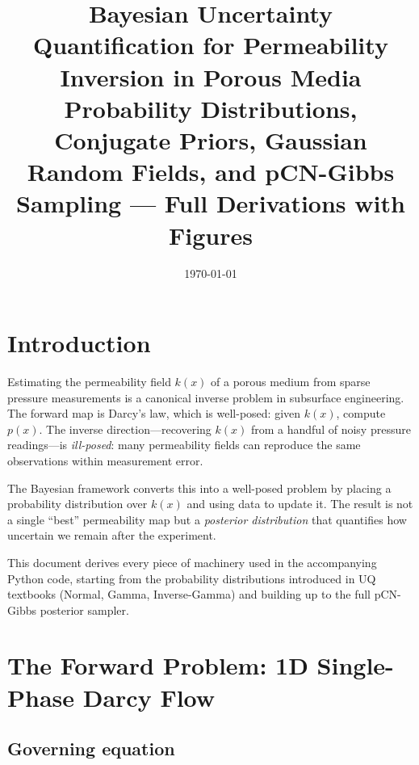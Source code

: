 \documentclass[11pt, a4paper]{article}
\theoremstyle{definition}
\begin{document}
\title{\textbf{Bayesian Uncertainty Quantification for Permeability Inversion
in Porous Media}\\[6pt]
\large Probability Distributions, Conjugate Priors, Gaussian Random Fields,
and pCN-Gibbs Sampling --- Full Derivations with Figures}
\author{}
\date{\today}
\maketitle
\tableofcontents
\newpage

\section{Introduction}

Estimating the permeability field $k(x)$ of a porous medium from sparse
pressure measurements is a canonical inverse problem in subsurface
engineering.  The forward map is Darcy's law, which is well-posed: given
$k(x)$, compute $p(x)$.  The inverse direction---recovering $k(x)$ from
a handful of noisy pressure readings---is \emph{ill-posed}: many permeability
fields can reproduce the same observations within measurement error.

The Bayesian framework converts this into a well-posed problem by placing a
probability distribution over $k(x)$ and using data to update it.  The result
is not a single ``best'' permeability map but a \emph{posterior distribution}
that quantifies how uncertain we remain after the experiment.

This document derives every piece of machinery used in the accompanying Python
code, starting from the probability distributions introduced in UQ textbooks
(Normal, Gamma, Inverse-Gamma) and building up to the full pCN-Gibbs posterior
sampler.

\section{The Forward Problem: 1D Single-Phase Darcy Flow}

\subsection{Governing equation}
\end{document}
